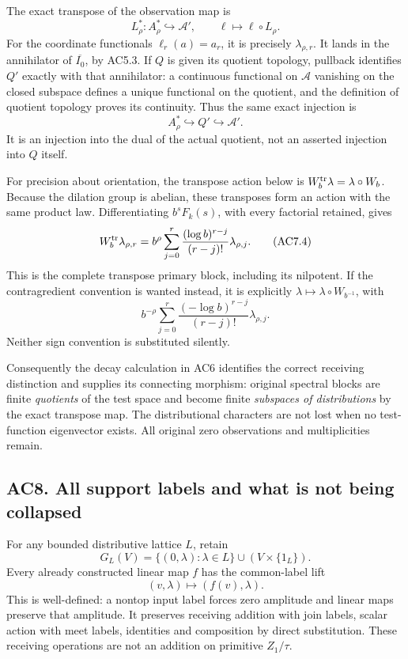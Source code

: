 The exact transpose of the observation map is \[
 L_\rho^*:A_\rho^*\hookrightarrow\mathcal A',\qquad
 \ell\longmapsto\ell\circ L_\rho.
\tag{AC7.2}
\] For the coordinate functionals \(\ell_r(a)=a_r\), it is precisely
\(\lambda_{\rho,r}\). It lands in the annihilator of \(\overline{I_0}\),
by AC5.3. If \(Q\) is given its quotient topology, pullback identifies
\(Q'\) exactly with that annihilator: a continuous functional on
\(\mathcal A\) vanishing on the closed subspace defines a unique
functional on the quotient, and the definition of quotient topology
proves its continuity. Thus the same exact injection is \[
 A_\rho^*\hookrightarrow Q'\hookrightarrow\mathcal A'.
\tag{AC7.3}
\] It is an injection into the dual of the actual quotient, not an
asserted injection into \(Q\) itself.

For precision about orientation, the transpose action below is
\(W_b^{\rm tr}\lambda=\lambda\circ W_b\). Because the dilation group is
abelian, these transposes form an action with the same product law.
Differentiating \(b^sF_k(s)\), with every factorial retained, gives \[
 W_b^{\rm tr}\lambda_{\rho,r}
 =b^\rho\sum_{j=0}^{r}
 \frac{(\log b)^{r-j}}{(r-j)!}\lambda_{\rho,j}.
\tag{AC7.4}
\] This is the complete transpose primary block, including its
nilpotent. If the contragredient convention is wanted instead, it is
explicitly \(\lambda\mapsto\lambda\circ W_{b^{-1}}\), with \[
 b^{-\rho}\sum_{j=0}^{r}
 \frac{(-\log b)^{r-j}}{(r-j)!}\lambda_{\rho,j}.
\tag{AC7.5}
\] Neither sign convention is substituted silently.

Consequently the decay calculation in AC6 identifies the correct
receiving distinction and supplies its connecting morphism: original
spectral blocks are finite \emph{quotients} of the test space and become
finite \emph{subspaces of distributions} by the exact transpose map. The
distributional characters are not lost when no test-function eigenvector
exists. All original zero observations and multiplicities remain.

\subsection{AC8. All support labels and what is not being
collapsed}\label{ac8.-all-support-labels-and-what-is-not-being-collapsed}

For any bounded distributive lattice \(L\), retain \[
 G_L(V)=\{(0,\lambda):\lambda\in L\}\cup(V\times\{1_L\}).
\] Every already constructed linear map \(f\) has the common-label lift
\[
 (v,\lambda)\longmapsto(f(v),\lambda).
\tag{AC8.1}
\] This is well-defined: a nontop input label forces zero amplitude and
linear maps preserve that amplitude. It preserves receiving addition
with join labels, scalar action with meet labels, identities and
composition by direct substitution. These receiving operations are not
an addition on primitive \(Z_1/\tau\).

